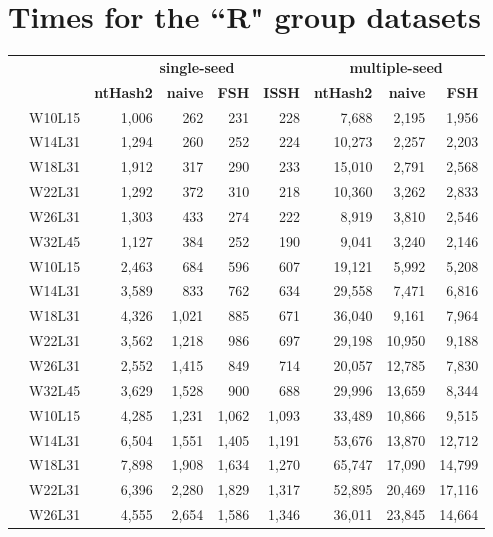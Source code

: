 \section{Times for the “R" group datasets}
\begin{table}[!ht]
	\raggedleft
	\begin{tabular}{c r | rrrr | rrr}
		& & \multicolumn{4}{|c}{\textbf{single-seed}} & \multicolumn{3}{|c}{\textbf{multiple-seed}} \\
		& & \textbf{ntHash2} & \textbf{naive} & \textbf{FSH} & \textbf{ISSH} & \textbf{ntHash2} &  \textbf{naive} & \textbf{FSH} \\
		\toprule
		\multirow{6}{*}{\rotatebox[origin=c]{90}{\textbf{R80}}}
		& W10L15 & 1,006 & 262 & 231 & 228 & 7,688 & 2,195 & 1,956 \\
		& W14L31 & 1,294 & 260 & 252 & 224 & 10,273 & 2,257 & 2,203 \\
		& W18L31 & 1,912 & 317 & 290 & 233 & 15,010 & 2,791 & 2,568 \\
		& W22L31 & 1,292 & 372 & 310 & 218 & 10,360 & 3,262 & 2,833 \\
		& W26L31 & 1,303 & 433 & 274 & 222 & 8,919 & 3,810 & 2,546 \\
		& W32L45 & 1,127 & 384 & 252 & 190 & 9,041 & 3,240 & 2,146 \\
		\midrule
		\multirow{6}{*}{\rotatebox[origin=c]{90}{\textbf{R200}}}
		& W10L15 & 2,463 & 684 & 596 & 607 & 19,121 & 5,992 & 5,208 \\
		& W14L31 & 3,589 & 833 & 762 & 634 & 29,558 & 7,471 & 6,816 \\
		& W18L31 & 4,326 & 1,021 & 885 & 671 & 36,040 & 9,161 & 7,964 \\
		& W22L31 & 3,562 & 1,218 & 986 & 697 & 29,198 & 10,950 & 9,188 \\
		& W26L31 & 2,552 & 1,415 & 849 & 714 & 20,057 & 12,785 & 7,830 \\
		& W32L45 & 3,629 & 1,528 & 900 & 688 & 29,996 & 13,659 & 8,344 \\
		\midrule
		\multirow{6}{*}{\rotatebox[origin=c]{90}{\textbf{R350}}}
		& W10L15 & 4,285 & 1,231 & 1,062 & 1,093 & 33,489 & 10,866 & 9,515 \\
		& W14L31 & 6,504 & 1,551 & 1,405 & 1,191 & 53,676 & 13,870 & 12,712 \\
		& W18L31 & 7,898 & 1,908 & 1,634 & 1,270 & 65,747 & 17,090 & 14,799 \\
		& W22L31 & 6,396 & 2,280 & 1,829 & 1,317 & 52,895 & 20,469 & 17,116 \\
		& W26L31 & 4,555 & 2,654 & 1,586 & 1,346 & 36,011 & 23,845 & 14,664 \\

\end{tabular}
\end{table}
